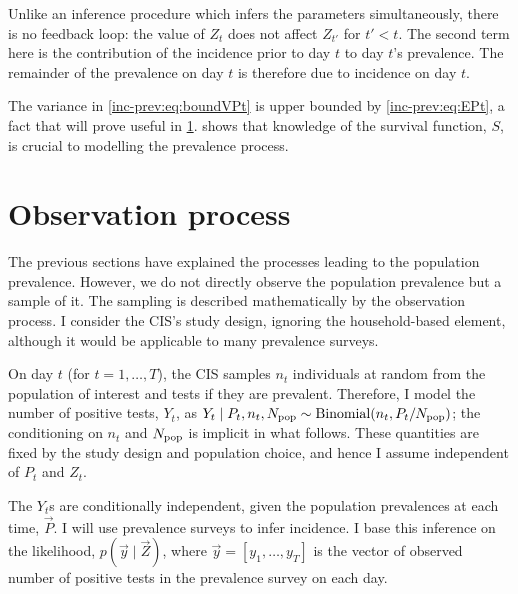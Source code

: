 \documentclass[thesis.tex]{subfiles}
\begin{document}
Unlike an inference procedure which infers the parameters simultaneously, there is no feedback loop: the value of $Z_{t}$ does not affect $Z_{t'}$ for $t' < t$.
The second term here is the contribution of the incidence prior to day $t$ to day $t$'s prevalence.
The remainder of the prevalence on day $t$ is therefore due to incidence on day $t$.

The variance in \cref{inc-prev:eq:boundVPt} is upper bounded by \cref{inc-prev:eq:EPt}, a fact that will prove useful in \cref{inc-prev:sec:observation-process}.
 shows that knowledge of the survival function, $S$, is crucial to modelling the prevalence process.

\section{Observation process} \label{inc-prev:sec:observation-process}

The previous sections have explained the processes leading to the population prevalence.
However, we do not directly observe the population prevalence but a sample of it.
The sampling is described mathematically by the observation process.
I consider the CIS's study design, ignoring the household-based element, although it would be applicable to many prevalence surveys.

On day $t$ (for $t = 1, \dots, T$), the CIS samples $n_t$ individuals at random from the population of interest and tests if they are prevalent.
Therefore, I model the number of positive tests, $Y_t$, as $Y_t \mid P_t, n_t, N_\text{pop} \sim \operatorname{Binomial}(n_t, P_t/N_\text{pop})$; the conditioning on $n_t$ and $N_\text{pop}$ is implicit in what follows.
These quantities are fixed by the study design and population choice, and hence I assume independent of $P_t$ and $Z_t$.

The $Y_t$s are conditionally independent, given the population prevalences at each time, $\vec{P}$.
I will use prevalence surveys to infer incidence.
I base this inference on the likelihood, $p(\vec{y} \mid \vec{Z})$, where $\vec{y} = [y_1, \dots, y_T]$ is the vector of observed number of positive tests in the prevalence survey on each day.
\end{document}
